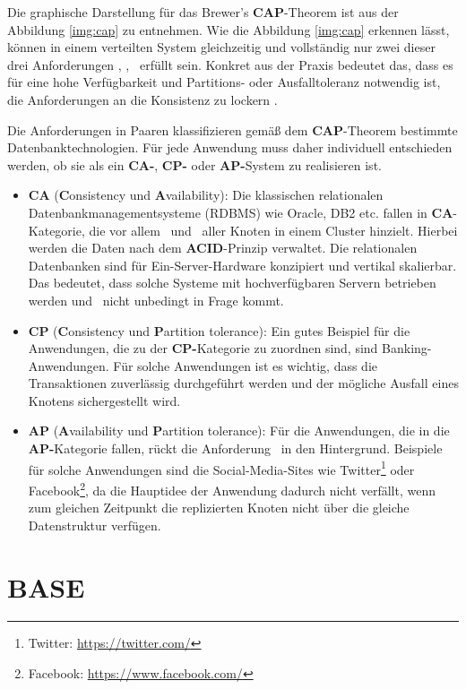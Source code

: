 Die graphische Darstellung für das Brewer's \textbf{CAP}-Theorem ist aus der Abbildung \ref{img:cap} zu entnehmen. Wie die Abbildung \ref{img:cap} erkennen lässt, können in einem verteilten System gleichzeitig und vollständig nur zwei dieser drei Anforderungen  \Cap, \cAp, \caP\ erfüllt sein. Konkret aus der Praxis bedeutet das, dass es für eine hohe Verfügbarkeit und Partitions- oder Ausfalltoleranz notwendig ist, die Anforderungen an die Konsistenz zu lockern \cite[S. 31]{Edlich.2011}.

Die Anforderungen in Paaren klassifizieren gemäß dem \textbf{CAP}-Theorem bestimmte Datenbanktechnologien. Für jede Anwendung muss daher individuell entschieden werden, ob sie als ein \textbf{CA-}, \textbf{CP-} oder \textbf{AP-}System zu realisieren ist.
\begin{itemize}
\item \textbf{CA} (\textbf{C}onsistency und \textbf{A}vailability): Die klassischen relationalen Datenbankmanagementsysteme (RDBMS) wie Oracle, DB2 etc. fallen in \textbf{CA}-Kategorie, die vor allem \Cap\ und \cAp\ aller Knoten in einem Cluster hinzielt. Hierbei werden die Daten nach dem \textbf{ACID}-Prinzip verwaltet. Die relationalen Datenbanken sind für Ein-Server-Hardware konzipiert und vertikal skalierbar. Das bedeutet, dass solche Systeme mit hochverfügbaren Servern betrieben werden und \caP\  nicht unbedingt in Frage kommt.

\item \textbf{CP} (\textbf{C}onsistency und \textbf{P}artition tolerance): Ein gutes Beispiel für die Anwendungen, die zu der \textbf{CP-}Kategorie zu zuordnen sind, sind Banking-Anwendungen. Für solche Anwendungen ist es wichtig, dass die Transaktionen zuverlässig durchgeführt werden und der mögliche Ausfall eines Knotens sichergestellt wird.

\item \textbf{AP} (\textbf{A}vailability und \textbf{P}artition tolerance): Für die Anwendungen, die in die \textbf{AP-}Kategorie fallen, rückt die Anforderung \Cap\ in den Hintergrund. Beispiele für solche Anwendungen sind die Social-Media-Sites wie Twitter\footnote{Twitter: \url{https://twitter.com/}} oder Facebook\footnote{Facebook: \url{https://www.facebook.com/}}, da die Hauptidee der Anwendung dadurch nicht verfällt, wenn zum gleichen Zeitpunkt die replizierten Knoten nicht über die gleiche Datenstruktur verfügen. 
\end{itemize}

\section{BASE}

